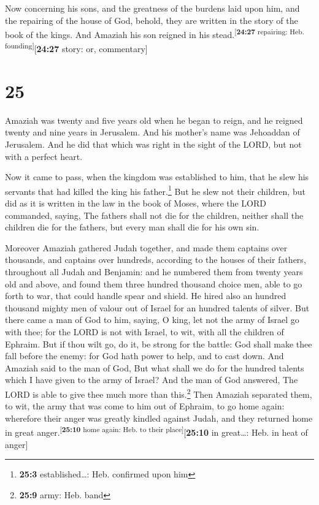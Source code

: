  Now concerning his sons, and the greatness of the
burdens laid upon him, and the repairing of the house of God, behold,
they are written in the story of the book of the kings. And Amaziah his
son reigned in his stead.\textsuperscript{{[}\textbf{24:27} repairing:
Heb. founding{]}}{[}\textbf{24:27} story: or, commentary{]}

\hypertarget{section-24}{%
\section{25}\label{section-24}}

 Amaziah was twenty and five years old when he began to
reign, and he reigned twenty and nine years in Jerusalem. And his
mother's name was Jehoaddan of Jerusalem.  And he did that
which was right in the sight of the LORD, but not with a perfect heart.

 Now it came to pass, when the kingdom was established to
him, that he slew his servants that had killed the king his
father.\footnote{\textbf{25:3} established\ldots: Heb. confirmed upon
  him}  But he slew not their children, but did as it is
written in the law in the book of Moses, where the LORD commanded,
saying, The fathers shall not die for the children, neither shall the
children die for the fathers, but every man shall die for his own sin.

 Moreover Amaziah gathered Judah together, and made them
captains over thousands, and captains over hundreds, according to the
houses of their fathers, throughout all Judah and Benjamin: and he
numbered them from twenty years old and above, and found them three
hundred thousand choice men, able to go forth to war, that could handle
spear and shield.  He hired also an hundred thousand
mighty men of valour out of Israel for an hundred talents of silver.
 But there came a man of God to him, saying, O king, let
not the army of Israel go with thee; for the LORD is not with Israel, to
wit, with all the children of Ephraim.  But if thou wilt
go, do it, be strong for the battle: God shall make thee fall before the
enemy: for God hath power to help, and to cast down.  And
Amaziah said to the man of God, But what shall we do for the hundred
talents which I have given to the army of Israel? And the man of God
answered, The LORD is able to give thee much more than this.\footnote{\textbf{25:9}
  army: Heb. band}  Then Amaziah separated them, to wit,
the army that was come to him out of Ephraim, to go home again:
wherefore their anger was greatly kindled against Judah, and they
returned home in great anger.\textsuperscript{{[}\textbf{25:10} home
again: Heb. to their place{]}}{[}\textbf{25:10} in great\ldots: Heb. in
heat of anger{]}

